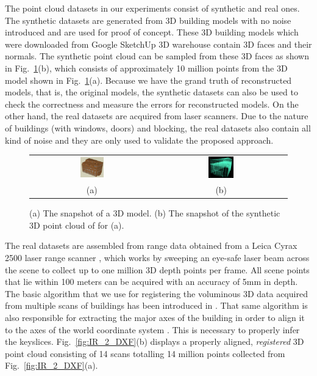 \documentclass[10pt,journal,cspaper,compsoc]{IEEEtran}
\newcommand{\Figa}[1]{Fig.~\ref{fig:#1}(a)}
\newcommand{\Figb}[1]{Fig.~\ref{fig:#1}(b)}
\begin{document}
The point cloud datasets in our experiments consist of synthetic and real ones. 
The synthetic datasets are generated from 3D building models 
with no noise introduced
and are used for proof of concept. 
These 3D building models which were downloaded from Google SketchUp 3D warehouse 
contain 3D faces and their normals.
The synthetic point cloud can be sampled from these 3D faces as shown in \Figb{syn_data}, 
which consists of approximately 10 million points from the 3D model shown in \Figa{syn_data}.
Because we have the grand truth of reconstructed models, 
that is, the original models, 
the synthetic datasets can also be used to check the correctness and 
measure the errors for reconstructed models. 
On the other hand, the real datasets are acquired from laser scanners.
Due to the nature of buildings (with windows, doors) and blocking, the real 
datasets also contain all kind of noise
and they are only used to validate the proposed approach.


\setlength{\tabcolsep}{1.4pt}

\begin{figure}[htbp]
\begin{center}
\begin{tabular}{cc}
        \includegraphics[width=0.2\textwidth]{cu_1.png} &
	\includegraphics[width=0.2\textwidth]{cu_2.png} \\
	(a) & (b)
\end{tabular}
\end{center}
\caption{
(a) The snapshot of a 3D model.
(b) The snapshot of the synthetic 3D point cloud of for (a).
}
\label{fig:syn_data}
\end{figure}

The real datasets are assembled from range data obtained from 
a Leica Cyrax 2500 laser range scanner \cite{RDP_LRS},
which works by sweeping an eye-safe laser beam across the scene to collect
up to one million 3D depth points per frame.
All scene points that lie within 100 meters can be acquired with an accuracy
of 5mm in depth.
The basic algorithm that we use for registering the voluminous 3D data
acquired from multiple scans of buildings has been introduced in
\cite{RDP_LS}.
That same algorithm is also responsible for extracting the major axes
of the building in order to align it to the axes of the world coordinate
system \cite{RDP_LSYGS}.
This is necessary to properly infer the keyslices.
\Figb{IR_2_DXF} displays a properly aligned, {\it registered} 3D point cloud
consisting of 14 scans totalling 14 million points
collected from \Figa{IR_2_DXF}.
\end{document}

